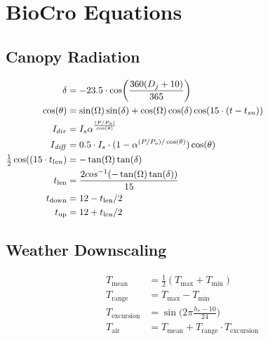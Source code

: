 \documentclass[10pt]{article}
\begin{document}
\section*{BioCro Equations}

\subsection*{Canopy Radiation}

\begin{align}
 \delta  &=  -23.5 \cdot \cos\biggl(\frac{360(D_{j}+10)}{365}\biggr) \hspace{2.5in} \label{eqn:delt} \\
 \cos(\theta)   &=  \sin(\Omega)\sin(\delta)+\cos(\Omega)\cos(\delta)\cos(15\cdot(t-t_{sn}))  \label{eqn:costheta}\\
 I_{dir}   &=  I_{s}\alpha^{\frac{(P/P_{o})}{\cos(\theta)}} \label{eqn:Idir}\\
 I_{\mathit{diff}}  &=   0.5 \cdot I_{s}\cdot(1-\alpha^{(P/P_{o})/\cos(\theta)})\cos(\theta) \\%
\tfrac{1}{2} \cos((15 \cdot t_{len})  &=  -\tan(\Omega)\tan(\delta) \label{eqn:costlen_old}  \\
t_\text{len} &= \frac{2cos^{-1}(-\tan(\Omega)\tan(\delta))}{15}\label{eqn:costlen} \label{eqn:tlen}\\
t_\text{down} &= 12-t_\text{len}/2\label{eqn:tdown}\\
t_\text{up} &= 12+t_\text{len}/2\label{eqn:tup}
\end{align}


\subsection*{Weather Downscaling}
\begin{align}
T_\text{mean} &= \frac{1}{2}\left(T_\text{max} + T_\text{min}\right)\label{eqn:Tmean}\\
T_\text{range} &= T_\text{max} - T_\text{min}\label{eqn:Trange}\\
T_\text{excursion}  &=  \sin\biggl(2 \pi \frac{h_{r}-10}{24}\biggr) \label{eqn:excur} \\
T_\text{air}  &=   T_\text{mean} + T_\text{range} \cdot T_\text{excursion} \label{eqn:Tair} 
\end{align}
\end{document}
